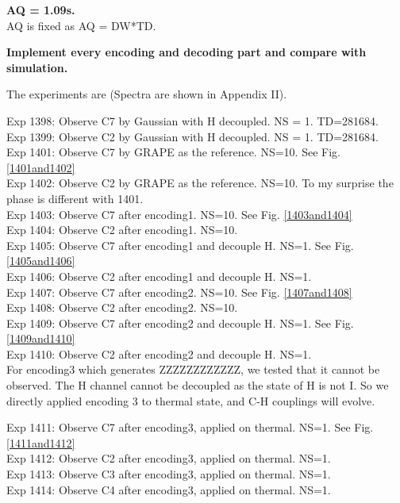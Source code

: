 \textbf{AQ = 1.09s.}\\
AQ is fixed as AQ = DW*TD.

{}

\textbf{Implement every encoding and decoding part and compare with simulation.}

The experiments are (Spectra are shown in Appendix II).

Exp 1398: Observe C7 by Gaussian with H decoupled. NS = 1. TD=281684. \\
Exp 1399: Observe C2 by Gaussian with H decoupled. NS = 1. TD=281684. \\
Exp 1401: Observe C7 by GRAPE as the reference. NS=10. See Fig. \ref{1401and1402}\\
Exp 1402: Observe C2 by GRAPE as the reference. NS=10. To my surprise the phase is different with 1401.\\
Exp 1403: Observe C7 after encoding1. NS=10. See Fig. \ref{1403and1404}\\
Exp 1404: Observe C2 after encoding1. NS=10.\\
Exp 1405: Observe C7 after encoding1 and decouple H. NS=1. See Fig. \ref{1405and1406}\\
Exp 1406: Observe C2 after encoding1 and decouple H. NS=1.\\
Exp 1407: Observe C7 after encoding2. NS=10. See Fig. \ref{1407and1408}\\
Exp 1408: Observe C2 after encoding2. NS=10.\\
Exp 1409: Observe C7 after encoding2 and decouple H. NS=1. See Fig. \ref{1409and1410}\\
Exp 1410: Observe C2 after encoding2 and decouple H. NS=1.\\

For encoding3 which generates ZZZZZZZZZZZZ, we tested that it cannot be observed. The H channel cannot be decoupled as the state of H is not I. So we directly applied encoding 3 to thermal state, and C-H couplings will evolve.

Exp 1411: Observe C7 after encoding3, applied on thermal. NS=1. See Fig. \ref{1411and1412}\\
Exp 1412: Observe C2 after encoding3, applied on thermal. NS=1.\\
Exp 1413: Observe C3 after encoding3, applied on thermal. NS=1.\\
Exp 1414: Observe C4 after encoding3, applied on thermal. NS=1.\\

